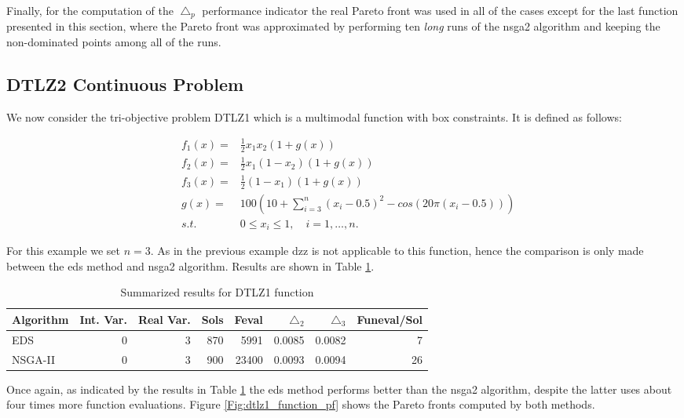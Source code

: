 Finally, for the computation of the $\bigtriangleup_p$ performance indicator the real Pareto front was used in all of the cases except for the last function presented in this section, where the Pareto front was approximated by performing ten \emph{long} runs of the \gls{nsga2} algorithm and keeping the non-dominated points among all of the runs.

\subsection{DTLZ2 Continuous Problem}

We now consider the tri-objective problem DTLZ1\cite{evolutionary_algorithms} which is a multimodal function with box constraints. It is defined as follows:

\begin{eqnarray}
& f_1(x) = & \frac{1}{2}x_1 x_2 (1 + g(x)) \nonumber \\
& f_2(x) = & \frac{1}{2}x_1 (1 - x_2) (1 + g(x)) \nonumber \\
& f_3(x) = & \frac{1}{2}(1 - x_1) (1 + g(x))\\
& g(x) = & 100(10 + \sum_{i = 3}^n(x_i - 0.5)^2 - cos(20 \pi (x_i - 0.5)))\nonumber \\
& s.t. & 0 \leq x_i \leq 1, \quad i = 1,\ldots,n. \nonumber
\end{eqnarray}

For this example we set $n = 3$. As in the previous example \gls{dzz} is not applicable to this function, hence the comparison is only made between the \gls{eds} method and \gls{nsga2} algorithm. Results are shown in Table \ref{table:results_dtlz1}.

\begin{table}[!htb]
\centering
\begin{tabular}{| l  r  r  r  r  r  r  r |}
	\hline
	Algorithm & Int. Var. & Real Var. & Sols & Feval & $\triangle_2$ & $\triangle_3$ & Funeval/Sol\\  
  	\hline
  	EDS & 0 & 3  & 870 & 5991  & 0.0085 & 0.0082 & 7\\
  	NSGA-II & 0 & 3 & 900 & 23400  & 0.0093 & 0.0094 & 26\\
  	\hline
\end{tabular}
\caption{Summarized results for DTLZ1 function}
\label{table:results_dtlz1}
\end{table}

Once again, as indicated by the results in Table \ref{table:results_dtlz1} the \gls{eds} method performs better than the \gls{nsga2} algorithm, despite the latter uses about four times more function evaluations. Figure \ref{Fig:dtlz1_function_pf} shows the Pareto fronts computed by both methods.

